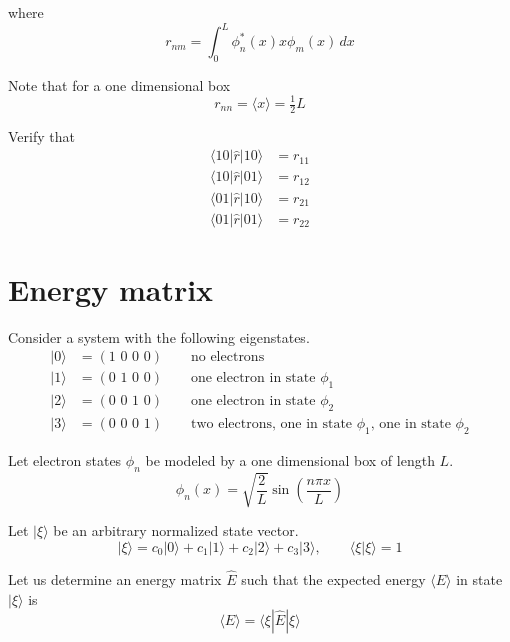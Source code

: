 \documentclass[12pt]{article}
\begin{document}
\noindent
where
\begin{equation*}
r_{nm}=\int_0^L\phi_n^*(x)x\phi_m(x)\,dx
\end{equation*}

\noindent
Note that for a one dimensional box
\begin{equation*}
r_{nn}=\langle x\rangle=\tfrac{1}{2}L
\end{equation*}

\noindent
Verify that
\begin{align*}
\langle10|\hat{r}|10\rangle&=r_{11}\\
\langle10|\hat{r}|01\rangle&=r_{12}\\
\langle01|\hat{r}|10\rangle&=r_{21}\\
\langle01|\hat{r}|01\rangle&=r_{22}
\end{align*}

\newpage

\section{Energy matrix}
Consider a system with the following eigenstates.
\begin{align*}
|0\rangle&=(\text{1 0 0 0})\qquad\text{no electrons}\\
|1\rangle&=(\text{0 1 0 0})\qquad\text{one electron in state $\phi_1$}\\
|2\rangle&=(\text{0 0 1 0})\qquad\text{one electron in state $\phi_2$}\\
|3\rangle&=(\text{0 0 0 1})\qquad\text{two electrons, one in state $\phi_1$, one in state $\phi_2$}
\end{align*}

\noindent
Let electron states $\phi_n$ be modeled by a one dimensional box of length $L$.
\begin{equation*}
\phi_n(x)=\sqrt{\frac{2}{L}}\sin\left(\frac{n\pi x}{L}\right)
\end{equation*}

\noindent
Let $|\xi\rangle$ be an arbitrary normalized state vector.
\begin{equation*}
|\xi\rangle=c_0|0\rangle+c_1|1\rangle+c_2|2\rangle+c_3|3\rangle,\qquad\langle\xi|\xi\rangle=1
\end{equation*}

\noindent
Let us determine an energy matrix $\hat{E}$ such that the expected
energy $\langle E \rangle$ in state $|\xi\rangle$ is
\begin{equation*}
\langle E\rangle=\langle\xi|\hat{E}|\xi\rangle
\end{equation*}
\end{document}
